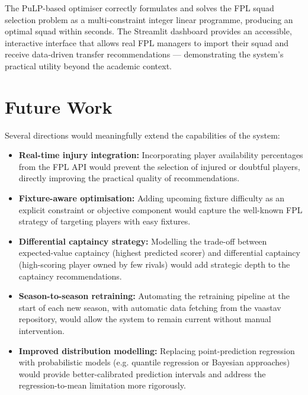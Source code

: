 \documentclass[11pt,english,listoffigures,listoftables]{tfgetsinf}
\begin{document}
The PuLP-based optimiser correctly formulates and solves the FPL squad selection problem as a multi-constraint integer linear programme, producing an optimal squad within seconds. The Streamlit dashboard provides an accessible, interactive interface that allows real FPL managers to import their squad and receive data-driven transfer recommendations --- demonstrating the system's practical utility beyond the academic context.

\section{Future Work}

Several directions would meaningfully extend the capabilities of the system:

\begin{itemize}
    \item \textbf{Real-time injury integration:} Incorporating player availability percentages from the FPL API would prevent the selection of injured or doubtful players, directly improving the practical quality of recommendations.

    \item \textbf{Fixture-aware optimisation:} Adding upcoming fixture difficulty as an explicit constraint or objective component would capture the well-known FPL strategy of targeting players with easy fixtures.

    \item \textbf{Differential captaincy strategy:} Modelling the trade-off between expected-value captaincy (highest predicted scorer) and differential captaincy (high-scoring player owned by few rivals) would add strategic depth to the captaincy recommendations.

    \item \textbf{Season-to-season retraining:} Automating the retraining pipeline at the start of each new season, with automatic data fetching from the vaastav repository, would allow the system to remain current without manual intervention.

    \item \textbf{Improved distribution modelling:} Replacing point-prediction regression with probabilistic models (e.g. quantile regression or Bayesian approaches) would provide better-calibrated prediction intervals and address the regression-to-mean limitation more rigorously.
\end{itemize}

\end{document}
